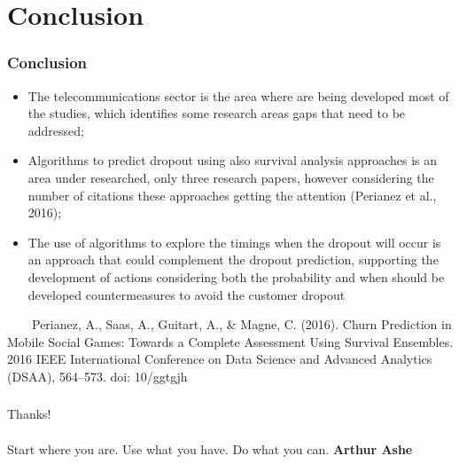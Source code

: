 \documentclass[10pt]{beamer}
\begin{document}
\section{Conclusion}
\begin{frame}
	\frametitle{Conclusion}
	\begin{itemize}
 		\item The telecommunications sector is the area where are being developed most of the studies, which identifies some research areas gaps that need to be addressed;
 		\item Algorithms to predict dropout using also survival analysis approaches is an area under researched, only three research papers, however  considering the number of citations these approaches getting the attention (Perianez et al., 2016);
 		\item The use of algorithms to explore the timings when the dropout will occur is an approach that could complement the dropout prediction, supporting the development of actions considering both the probability and when should be developed countermeasures to avoid the customer dropout
	\end{itemize}
	\tiny 
	~~~~Perianez, A., Saas, A., Guitart, A., \& Magne, C. (2016). Churn Prediction in Mobile Social Games: Towards a Complete Assessment Using Survival Ensembles. 2016 IEEE International Conference on Data Science and Advanced Analytics (DSAA), 564–573. doi: 10/ggtgjh

\end{frame}


\begin{frame}
\frametitle{}
\normalsize
	\Huge Thanks! \\~\\
	\Large Start where you are. Use what you have. Do what you can. \textbf{Arthur Ashe}
\end{frame}
\end{document}
